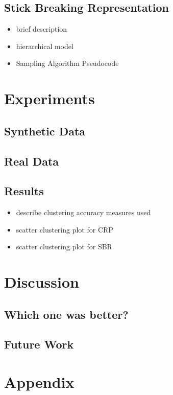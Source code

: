 \documentclass{article}
\begin{document}
\subsection{Stick Breaking Representation}

\begin{itemize}
	\item brief description
	\item hierarchical model
	\item Sampling Algorithm Pseudocode
\end{itemize}

\section{Experiments}

\subsection{Synthetic Data}

\subsection{Real Data}

\subsection{Results}
\begin{itemize}
	\item describe clustering accuracy measures used
	\item scatter clustering plot for CRP
	\item scatter clustering plot for SBR
\end{itemize}


\section{Discussion}

\subsection{Which one was better?}
\subsection{Future Work}



{\footnotesize


}

\section{Appendix}
\end{document}

